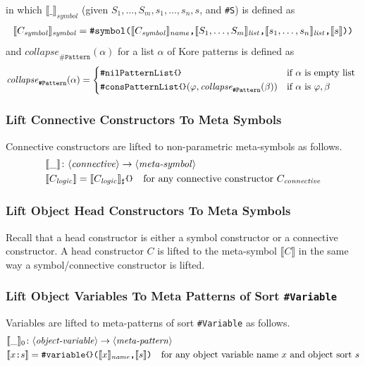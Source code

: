 \documentclass[UTF8,11pt]{article}
\theoremstyle{plain}
\theoremstyle{definition}
\theoremstyle{remark}
\newcommand{\cln}{\texttt{:}}
\newcommand{\parametric}[2]{{#1}\raisebox{.2ex}{\texttt{\footnotesize{\{}}}#2\raisebox{.2ex}{\texttt{\footnotesize{\}}}}}
\newcommand{\denote}[1]{\llbracket{#1}\rrbracket}
\newcommand{\sharpsymbol}{\#}
\newcommand{\Ksymbol}{\texttt{\sharpsymbol symbol}}
\newcommand{\KnilKPatternList}{\texttt{\sharpsymbol nilPatternList}}
\newcommand{\KconsKPatternList}{\texttt{\sharpsymbol consPatternList}}
\newcommand{\KVariable}{\texttt{\sharpsymbol Variable}}
\newcommand{\KPattern}{\texttt{\sharpsymbol Pattern}}
\newcommand{\Kvariable}{\texttt{\sharpsymbol variable}}
\newcommand{\name}{\mathit{name}}
\newcommand{\llist}{\mathit{list}}
\newcommand{\itlogic}{\mathit{logic}}
\newcommand{\itconnective}{\mathit{connective}}
\newcommand{\itsymbol}{\mathit{symbol}}
\newcommand{\collapse}{\mathit{collapse}}
\newcommand{\syntacc}[1]{\text{$\langle$\textit{#1}$\rangle$}}
\begin{document}
in which $\denote{\_}_\itsymbol$ (given 
$S_1,\dots,S_m,s_1,\dots,s_n,s$, and \texttt{\sharpsymbol S}) is 
defined as
\begin{align*}
  \denote{C_\itsymbol}_\itsymbol = 
  \texttt{\Ksymbol($\denote{C_\itsymbol}_\name$,$\denote{
  		S_1,\dots,S_m}_\llist$,$\denote{
  		s_1,\dots,s_n}_\llist$,$\denote{
  		s}$))}
\end{align*}
and $\collapse_\KPattern(\alpha)$ for a list $\alpha$ of Kore patterns is 
defined as
\begin{equation*}
\collapse_\KPattern(\alpha) =
\begin{cases*}
\parametric{\KnilKPatternList}{} & if $\alpha$ is empty list \\
\parametric{\KconsKPatternList}{}(\varphi, \collapse_\KPattern(\beta)) & if 
$\alpha$ is 
$\varphi, \beta$
\end{cases*}
\end{equation*}

\subsubsection{Lift Connective Constructors To Meta Symbols}
Connective constructors are lifted to non-parametric meta-symbols as 
follows.
\begin{align*}
& \denote{\_} \colon \syntacc{connective} \to \syntacc{meta-symbol} \\
& \denote{C_\itlogic} = \parametric{\denote{C_\itlogic}_\sharp}{} \quad 
\text{for any connective constructor $C_\itconnective$}
\end{align*}

\subsubsection{Lift Object Head Constructors To Meta Symbols}
Recall that a head constructor is either a symbol constructor or a connective 
constructor.
A head constructor $C$ is lifted to the meta-symbol $\denote{C}$ in the same 
way a symbol/connective constructor is lifted.

\subsubsection{Lift Object Variables To Meta Patterns of Sort \KVariable}
Variables are lifted to meta-patterns of sort {\KVariable} as follows.
\begin{align*}
&\denote{\_}_0 \colon \syntacc{object-variable} \to \syntacc{meta-pattern} \\
&\denote{x \cln s} = \texttt{\parametric{\Kvariable}{}($\denote{
		x}_\name$,$\denote{s}$)} \quad \text{for any object variable name $x$ 
		and object sort $s$}
\end{align*}
\end{document}

